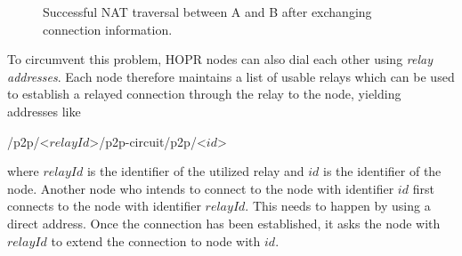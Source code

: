\begin{figure}[H]
    \label{fig:successful-nat-traversal}
    \caption{Successful NAT traversal between A and B after exchanging connection information.}
\end{figure}

To circumvent this problem, HOPR nodes can also dial each other using \textit{relay addresses}. Each node therefore maintains a list of usable relays which can be used to establish a relayed connection through the relay to the node, yielding addresses like

\begin{center}
    \textsf{/p2p/}\textless\textsf{$relayId$}\textgreater\textsf{/p2p-circuit/p2p/}\textless{}\textsf{$id$}\textgreater{}
\end{center}

where $relayId$ is the identifier of the utilized relay and $id$ is the identifier of the node. Another node who intends to connect to the node with identifier $id$ first connects to the node with identifier $relayId$. This needs to happen by using a direct address. Once the connection has been established, it asks the node with $relayId$ to extend the connection to node with $id$.
